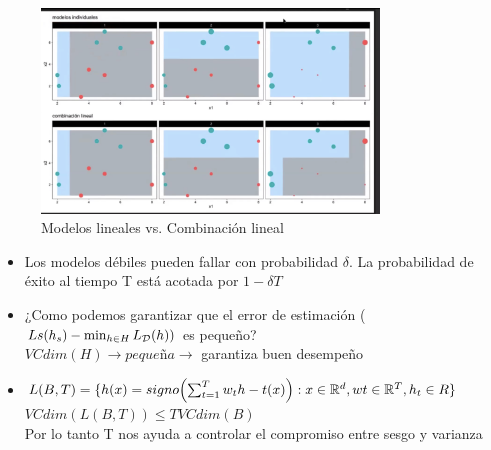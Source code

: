 \documentclass[11pt,reqno,twoside]{article}
\begin{document}
\begin{figure}[H]
    \centering
    \includegraphics[width=0.8\textwidth]{Adaboost.jpeg}
    \caption{Modelos lineales vs. Combinación lineal}
    \label{fig:my_label}
\end{figure}
\begin{itemize}
    \item Los modelos débiles pueden fallar con probabilidad $\delta$. La probabilidad de éxito al tiempo T está acotada por $1-\delta T$
    \item ¿Como podemos garantizar que el error de estimación ($Ls(h_s) - \min_{h\in H} L_{\operatorname{\mathcal{D}}}(h))$ es pequeño?\\
    $VCdim(H)\rightarrow pequeña \rightarrow$ garantiza buen desempeño
    \item $L(B,T)= \{h(x)= signo \left( \sum_{t=1}^T w_t h-t(x) \right) : x\in \R^d, wt \in \R^T, h_t \in R \}$
    \\
    $VCdim(L(B,T)) \leq T VCdim(B)$
    \\ Por lo tanto T nos ayuda a controlar el compromiso entre sesgo y varianza
\end{itemize}

\end{document}
